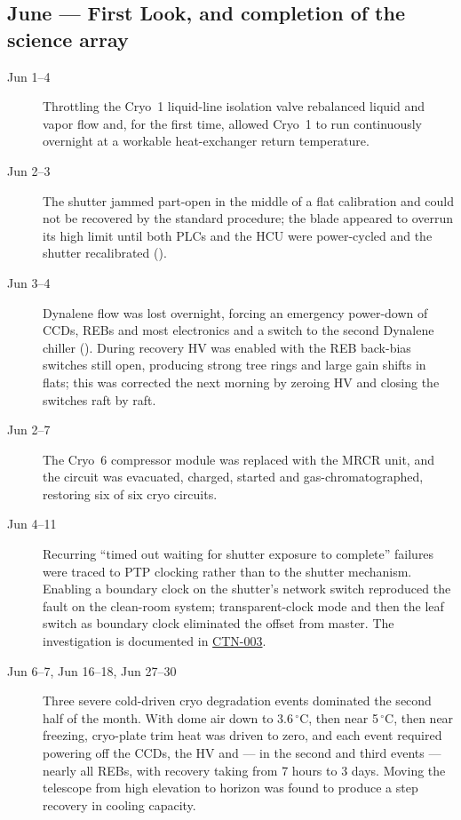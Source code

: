 \subsection{June --- First Look, and completion of the science array}
\begin{description}
\item[Jun 1--4] Throttling the Cryo~1 liquid-line isolation valve
  rebalanced liquid and vapor flow and, for the first time, allowed
  Cryo~1 to run continuously overnight at a workable heat-exchanger return
  temperature.

\item[Jun 2--3] The shutter jammed part-open in the middle of a flat
  calibration and could not be recovered by the standard procedure;
  the blade appeared to overrun its high limit until both PLCs and the
  HCU were power-cycled and the shutter recalibrated ().

\item[Jun 3--4] Dynalene flow was lost overnight, forcing an
  emergency power-down of CCDs, REBs and most electronics and a switch
  to the second Dynalene chiller ().  During recovery HV was
  enabled with the REB back-bias switches still open, producing strong
  tree rings and large gain shifts in flats; this was corrected the
  next morning by zeroing HV and closing the switches raft by raft.

\item[Jun 2--7] The Cryo~6 compressor module was replaced with the
  MRCR unit, and the circuit was evacuated, charged, started and
  gas-chromatographed, restoring six of six cryo circuits.

\item[Jun 4--11] Recurring ``timed out waiting for shutter exposure to
  complete'' failures were traced to PTP clocking rather than to the
  shutter mechanism.  Enabling a boundary clock on the shutter's
  network switch reproduced the fault on the clean-room system;
  transparent-clock mode and then the leaf switch as boundary clock
  eliminated the offset from master.  The investigation is documented
  in \href{https://ctn-003.lsst.io}{CTN-003}.

\item[Jun 6--7, Jun 16--18, Jun 27--30] Three severe cold-driven cryo
  degradation events dominated the second half of the month.  With
  dome air down to 3.6\,$^{\circ}$C, then near 5\,$^{\circ}$C, then
  near freezing, cryo-plate trim heat was driven to zero, and each
  event required powering off the CCDs, the HV and --- in the second
  and third events --- nearly all REBs, with recovery taking from
  7 hours to 3 days.  Moving the telescope from high elevation
  to horizon was found to produce a step recovery in cooling capacity.


\end{description}
